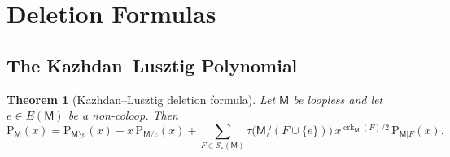 \documentclass[12pt,letterpaper,english]{amsart}
\theoremstyle{teoremas}
\newtheorem{theorem}{Theorem}[section]
\theoremstyle{definition}
\DeclareMathOperator{\crk}{crk}
\newcommand{\M}{\mathsf{M}}
\newcommand{\PP}{\mathrm{P}}
\newcommand{\Se}{\mathcal{S}_e}
\begin{document}
\section{Deletion Formulas}

\subsection{The Kazhdan--Lusztig Polynomial}

\begin{theorem}[Kazhdan--Lusztig deletion formula]\label{thm:KL-del}
Let $\M$ be loopless and let $e \in E(\M)$ be a non-coloop.  Then
\[
\PP_{\M}(x) = \PP_{\M \setminus e}(x) - x\, \PP_{\M/e}(x)
  + \sum_{F \in \Se(\M)}
    \tau\bigl(\M/(F \cup \{e\})\bigr)\, x^{\crk_{\M}(F)/2}\,
    \PP_{\M|F}(x).
\]
\end{theorem}
\end{document}
